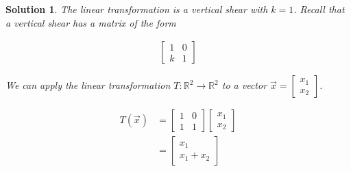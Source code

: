 \documentclass{article}
\newtheorem*{solution}{Solution}
\begin{document}
\begin{solution}
The linear transformation is a vertical shear with $k = 1$. Recall that a vertical shear has a matrix of the form 

\begin{align*}
\begin{bmatrix}
1 & 0 \\
k & 1
\end{bmatrix}
\end{align*}

We can apply the linear transformation $T : \mathbb{R}^2 \to \mathbb{R}^2$ to a vector $\vec{x} = \begin{bmatrix} x_{1} \\ x_{2} \end{bmatrix}$.

\begin{align*}
T(\vec{x}) &=
\begin{bmatrix}
1 & 0 \\
1 & 1
\end{bmatrix} \begin{bmatrix} x_{1} \\ x_{2} \end{bmatrix} \\
&= \begin{bmatrix} x_{1} \\ x_{1} + x_{2} \end{bmatrix}
\end{align*}
\end{solution}
\end{document}
